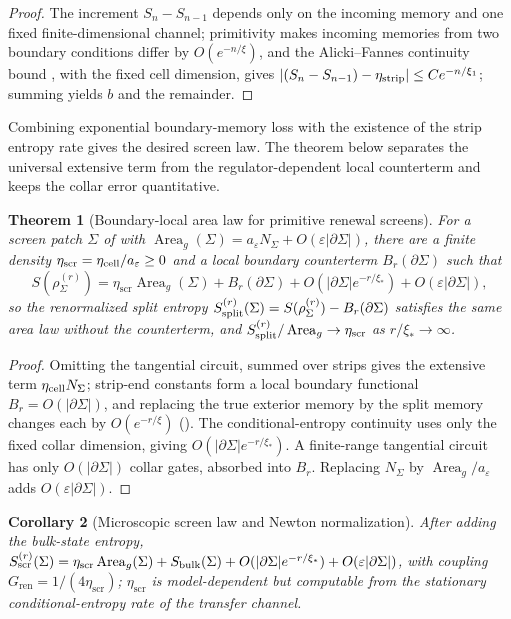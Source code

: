 \documentclass[11pt]{article}
\newtheorem{theorem}{Theorem}[section]
\newtheorem{corollary}[theorem]{Corollary}
\theoremstyle{definition}
\theoremstyle{remark}
\newcommand{\eps}{\varepsilon}
\newcommand{\Area}{\operatorname{Area}}
\newcommand{\bulk}{\mathrm{bulk}}
\newcommand{\etaScr}{\eta_{\mathrm{scr}}}
\newcommand{\Gren}{G_{\mathrm{ren}}}
\begin{document}
\begin{proof}
The increment $S_n-S_{n-1}$ depends only on the incoming memory and one fixed
finite-dimensional channel; primitivity makes incoming memories from two boundary
conditions differ by $O(e^{-n/\xi})$, and the Alicki--Fannes continuity bound
\cite{AlickiFannes}, with the fixed cell dimension, gives
$|(S_n-S_{n-1})-\eta_{\rm strip}|\le Ce^{-n/\xi_1}$; summing yields $b$ and the
remainder.
\end{proof}

Combining exponential boundary-memory loss with the existence of the strip
entropy rate gives the desired screen law.  The theorem below separates the
universal extensive term from the regulator-dependent local counterterm and
keeps the collar error quantitative.

\begin{theorem}[Boundary-local area law for primitive renewal screens]
\label{thm:renewal-screen-area-law}
For a screen patch $\Sigma$ of  with
$\Area_g(\Sigma)=a_\eps N_\Sigma+O(\eps|\partial\Sigma|)$, there are a finite
density $\etaScr=\eta_{\rm cell}/a_\eps\ge0$ and a local boundary counterterm
$B_r(\partial\Sigma)$ such that
\[
 S(\rho^{(r)}_\Sigma)=\etaScr\Area_g(\Sigma)+B_r(\partial\Sigma)
 +O(|\partial\Sigma|e^{-r/\xi_*})+O(\eps|\partial\Sigma|),
\]
so the renormalized split entropy
$S_{\rm split}^{(r)}(\Sigma)=S(\rho^{(r)}_\Sigma)-B_r(\partial\Sigma)$ satisfies the
same area law without the counterterm, and
$S_{\rm split}^{(r)}/\Area_g\to\etaScr$ as $r/\xi_*\to\infty$.
\end{theorem}

\begin{proof}
Omitting the tangential circuit,  summed over strips
gives the extensive term $\eta_{\rm cell}N_\Sigma$; strip-end constants form a
local boundary functional $B_r=O(|\partial\Sigma|)$, and replacing the true
exterior memory by the split memory changes each by $O(e^{-r/\xi})$
().  The conditional-entropy continuity uses only
the fixed collar dimension, giving $O(|\partial\Sigma|e^{-r/\xi_*})$.  A finite-range
tangential circuit has only $O(|\partial\Sigma|)$ collar gates, absorbed into
$B_r$.  Replacing $N_\Sigma$ by $\Area_g/a_\eps$ adds $O(\eps|\partial\Sigma|)$.
\end{proof}

\begin{corollary}[Microscopic screen law and Newton normalization]
\label{cor:microscopic-screen-law}
After adding the bulk-state entropy,
$S_{\rm scr}^{(r)}(\Sigma)=\etaScr\Area_g(\Sigma)+S_{\bulk}(\Sigma)
+O(|\partial\Sigma|e^{-r/\xi_*})+O(\eps|\partial\Sigma|)$, with coupling
$\Gren=1/(4\etaScr)$; $\etaScr$ is model-dependent but computable from the
stationary conditional-entropy rate of the transfer channel.
\end{corollary}
\end{document}
